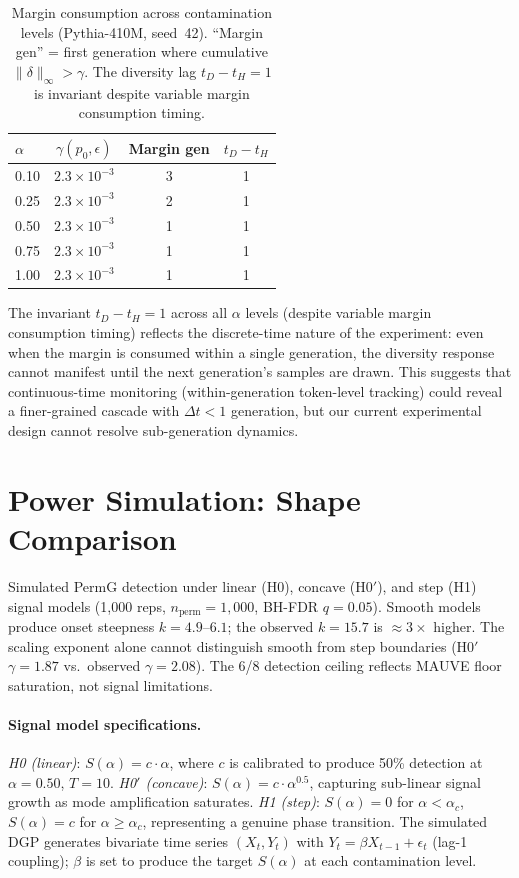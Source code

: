 \begin{table}[t]
\centering
\small
\caption{Margin consumption across contamination levels (Pythia-410M, seed~42). ``Margin gen'' = first generation where cumulative $\|\delta\|_\infty > \gamma$. The diversity lag $t_D - t_H{=}1$ is invariant despite variable margin consumption timing.}
\label{tab:margin_consumption}
\begin{tabular}{lccc}
\toprule
$\alpha$ & $\gamma(p_0, \epsilon)$ & Margin gen & $t_D - t_H$ \\
\midrule
0.10 & $2.3 \times 10^{-3}$ & 3 & 1 \\
0.25 & $2.3 \times 10^{-3}$ & 2 & 1 \\
0.50 & $2.3 \times 10^{-3}$ & 1 & 1 \\
0.75 & $2.3 \times 10^{-3}$ & 1 & 1 \\
1.00 & $2.3 \times 10^{-3}$ & 1 & 1 \\
\bottomrule
\end{tabular}
\end{table}

The invariant $t_D - t_H = 1$ across all $\alpha$ levels (despite variable margin consumption timing) reflects the discrete-time nature of the experiment: even when the margin is consumed within a single generation, the diversity response cannot manifest until the next generation's samples are drawn.
This suggests that continuous-time monitoring (within-generation token-level tracking) could reveal a finer-grained cascade with $\Delta t < 1$ generation, but our current experimental design cannot resolve sub-generation dynamics.

\section{Power Simulation: Shape Comparison}
\label{app:power_sim}

Simulated PermG detection under linear (H0), concave (H0$'$), and step (H1) signal models (1{,}000 reps, $n_\text{perm}{=}1{,}000$, BH-FDR $q{=}0.05$).
Smooth models produce onset steepness $k{=}4.9$--$6.1$; the observed $k{=}15.7$ is ${\approx}3{\times}$ higher.
The scaling exponent alone cannot distinguish smooth from step boundaries (H0$'$ $\gamma{=}1.87$ vs.\ observed $\gamma{=}2.08$).
The 6/8 detection ceiling reflects MAUVE floor saturation, not signal limitations.

\paragraph{Signal model specifications.}
\emph{H0 (linear)}: $S(\alpha) = c \cdot \alpha$, where $c$ is calibrated to produce 50\% detection at $\alpha{=}0.50$, $T{=}10$.
\emph{H0$'$ (concave)}: $S(\alpha) = c \cdot \alpha^{0.5}$, capturing sub-linear signal growth as mode amplification saturates.
\emph{H1 (step)}: $S(\alpha) = 0$ for $\alpha < \alpha_c$, $S(\alpha) = c$ for $\alpha \geq \alpha_c$, representing a genuine phase transition.
The simulated DGP generates bivariate time series $(X_t, Y_t)$ with $Y_t = \beta X_{t-1} + \epsilon_t$ (lag-1 coupling); $\beta$ is set to produce the target $S(\alpha)$ at each contamination level.

